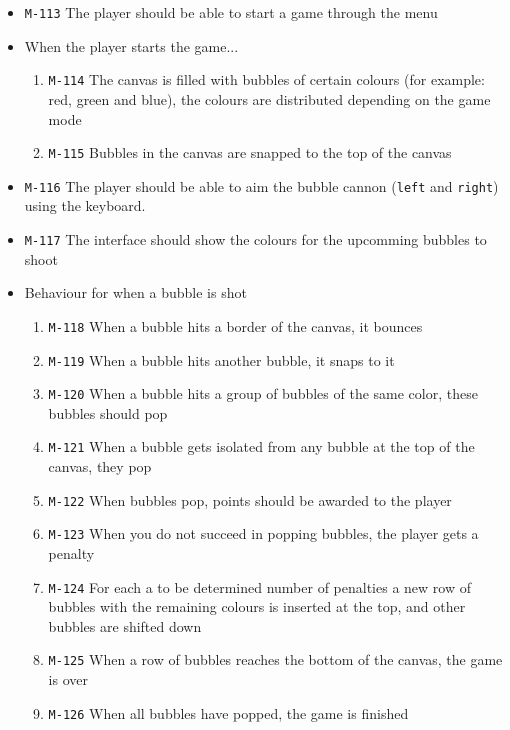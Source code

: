 \documentclass[a4paper]{article}
\begin{document}
\begin{itemize}
  \item \texttt{M-113} The player should be able to start a game through the menu

  \item When the player starts the game...
  \begin{enumerate}
    \item \texttt{M-114} The canvas is filled with bubbles of certain colours (for example: red, green and blue), the colours are distributed depending on the game mode
    \item \texttt{M-115} Bubbles in the canvas are snapped to the top of the canvas
  \end{enumerate}
  
  \item \texttt{M-116} The player should be able to aim the bubble cannon (\texttt{left} and \texttt{right}) using the keyboard.
  \item \texttt{M-117} The interface should show the colours for the upcomming bubbles to shoot
  \item Behaviour for when a bubble is shot
  \begin{enumerate}
    \item \texttt{M-118} When a bubble hits a border of the canvas, it bounces
    \item \texttt{M-119} When a bubble hits another bubble, it snaps to it
    \item \texttt{M-120} When a bubble hits a group of bubbles of the same color, these bubbles should pop
    \item \texttt{M-121} When a bubble gets isolated from any bubble at the top of the canvas, they pop
    \item \texttt{M-122} When bubbles pop, points should be awarded to the player
    \item \texttt{M-123} When you do not succeed in popping bubbles, the player gets a penalty
    \item \texttt{M-124} For each a to be determined number of penalties a new row of bubbles with the remaining colours is inserted at the top, and other bubbles are shifted down
    \item \texttt{M-125} When a row of bubbles reaches the bottom of the canvas, the game is over
    \item \texttt{M-126} When all bubbles have popped, the game is finished
  \end{enumerate}
  

\end{itemize}
\end{document}

